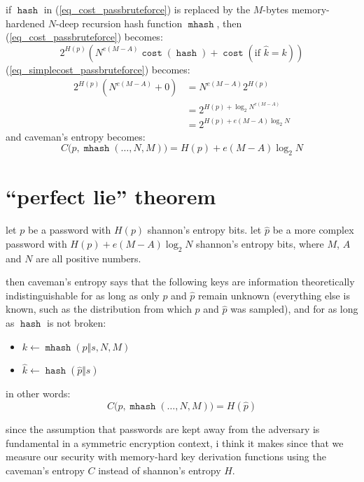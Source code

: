 \documentclass[twocolumn]{article}
\DeclareMathOperator{\hash}{\mathtt{hash}}
\DeclareMathOperator{\mhash}{\mathtt{mhash}}
\DeclareMathOperator{\cost}{\mathtt{cost}}
\begin{document}
if $\hash$ in (\ref{eq_cost_passbruteforce}) is replaced by the $M$-bytes
memory-hardened $N$-deep recursion hash function $\mhash$, then
(\ref{eq_cost_passbruteforce}) becomes:
\begin{equation}\label{eq_cost_passbruteforce_NM}
    2^{H(p)} \left(
        N^{e(M-A)}\cost(\hash) + \cost(\text{if } \hat k = k)
    \right)
\end{equation}
(\ref{eq_simplecost_passbruteforce}) becomes:
\begin{equation}\label{eq_simplecost_passbruteforce_NM}
    \begin{split}
    2^{H(p)} (N^{e(M-A)}+0) &= N^{e(M-A)} 2^{H(p)} \\
                  &= 2^{H(p) + \log_2 N^{e(M-A)}} \\
                  &= 2^{H(p) + e(M-A)\log_2 N}
    \end{split}
\end{equation}
and caveman's entropy becomes:
\begin{equation}
    C\Big(p, \mhash(\ldots, N, M)\Big) = H(p) + e(M-A)\log_2 N
\end{equation}

\section{``perfect lie'' theorem}
let $p$ be a password with $H(p)$ shannon's entropy bits.  let $\hat p$ be
a more complex password with $H(p) + e(M-A)\log_2 N$ shannon's entropy
bits, where $M$, $A$ and $N$ are all positive numbers.

then caveman's entropy says that the following keys are information
theoretically indistinguishable for as long as only $p$ and $\hat p$ remain
unknown (everything else is known, such as the distribution from which $p$
and $\hat p$ was sampled), and for as long as $\hash$ is not broken:
\begin{itemize}
    \item $k \gets \mhash(p \Vert s, N, M)$
    \item $\hat k \gets \hash(\hat p \Vert s)$
\end{itemize}

in other words:
\begin{equation}
    C\Big(p, \mhash(\ldots, N, M)\Big) = H(\hat p)
\end{equation}

since the assumption that passwords are kept away from the adversary is
fundamental in a symmetric encryption context, i think it makes since that
we measure our security with memory-hard key derivation functions using the
caveman's entropy $C$ instead of shannon's entropy $H$.
\end{document}
